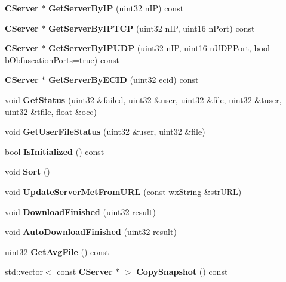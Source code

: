 \begin{DoxyCompactItemize}
\item 
{\bf CServer} $\ast$ {\bfseries GetServerByIP} (uint32 nIP) const \label{classCServerList_a27453179713ed32d07ffb9ab2469f3d4}

\item 
{\bf CServer} $\ast$ {\bfseries GetServerByIPTCP} (uint32 nIP, uint16 nPort) const \label{classCServerList_a6dd3c4440f647fadab05b3ed86d41b06}

\item 
{\bf CServer} $\ast$ {\bfseries GetServerByIPUDP} (uint32 nIP, uint16 nUDPPort, bool bObfuscationPorts=true) const \label{classCServerList_abd6f6bcee034d4dfb48ea9bea161741d}

\item 
{\bf CServer} $\ast$ {\bfseries GetServerByECID} (uint32 ecid) const \label{classCServerList_af89bcb43fe9fc5f6c42ee4cf875ccffd}

\item 
void {\bfseries GetStatus} (uint32 \&failed, uint32 \&user, uint32 \&file, uint32 \&tuser, uint32 \&tfile, float \&occ)\label{classCServerList_afe8992512d4c1fed265dd14550ef212c}

\item 
void {\bfseries GetUserFileStatus} (uint32 \&user, uint32 \&file)\label{classCServerList_a3b83714c248a6d65230a310acc51028e}

\item 
bool {\bfseries IsInitialized} () const \label{classCServerList_a970eafa8dd76862ccb8f74a13a350889}

\item 
void {\bfseries Sort} ()\label{classCServerList_a635825293b9d5576baf8be67e5d9efb4}

\item 
void {\bfseries UpdateServerMetFromURL} (const wxString \&strURL)\label{classCServerList_a08f5cd3a79f9154b2b0466fe91b28e0c}

\item 
void {\bfseries DownloadFinished} (uint32 result)\label{classCServerList_a552e685444f12b8f14e451832061a006}

\item 
void {\bfseries AutoDownloadFinished} (uint32 result)\label{classCServerList_a5381e010c4253dec3f522f8c46197b0c}

\item 
uint32 {\bfseries GetAvgFile} () const \label{classCServerList_aff09c2aad7e8665b92bab90516adcb70}

\item 
std::vector$<$ const {\bf CServer} $\ast$ $>$ {\bfseries CopySnapshot} () const \label{classCServerList_a96955ffb85b6e21f207db185a5b3610e}


\end{DoxyCompactItemize}

